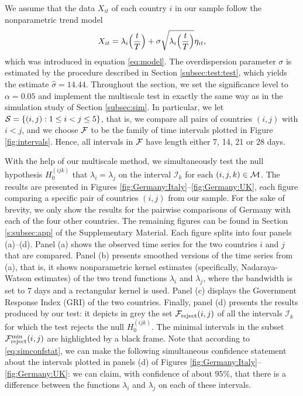 \documentclass[a4paper,12pt]{article}
\numberwithin{equation}{section}
\begin{document}
We assume that the data $X_{it}$ of each country $i$ in our sample follow the nonparametric trend model 
\[ X_{it} = \lambda_i\Big(\frac{t}{T}\Big) + \sigma \sqrt{\lambda_i\Big(\frac{t}{T}\Big)} \eta_{it}, \]
which was introduced in equation \eqref{eq:model}. The overdispersion parameter $\sigma$ is estimated by the procedure described in Section \ref{subsec:test:test}, which yields the estimate $\hat{\sigma} = 14.44$. Throughout the section, we set the significance level to $\alpha=0.05$ and implement the multiscale test in exactly the same way as in the simulation study of Section \ref{subsec:sim}. In particular, we let $\mathcal{S} = \{ (i,j): 1 \le i < j \le 5\}$, that is, we compare all pairs of countries $(i,j)$ with $i < j$, and we choose $\mathcal{F}$ to be the family of time intervals plotted in Figure \ref{fig:intervals}. Hence, all intervals in $\mathcal{F}$ have length either 7, 14, 21 or 28 days. 


With the help of our multiscale method, we simultaneously test the null hypo\-thesis $H_0^{(ijk)}$ that $\lambda_i = \lambda_j$ on the interval $\mathcal{I}_k$ for each $(i, j, k) \in \mathcal{M}$. The results are presented in Figures \ref{fig:Germany:Italy}--\ref{fig:Germany:UK}, each figure comparing a specific pair of countries $(i,j)$ from our sample. For the sake of brevity, we only show the results for the pairwise comparisons of Germany with each of the four other countries. The remaining figures can be found in Section \ref{s:subsec:app} of the Supplementary Material. Each figure splits into four panels (a)--(d).  Panel (a) shows the observed time series for the two countries $i$ and $j$ that are compared. Panel (b) presents smoothed versions of the time series from (a), that is, it shows nonparametric kernel estimates (specifically, Nadaraya-Watson estimates) of the two trend functions $\lambda_i$ and $\lambda_j$, where the bandwidth is set to $7$ days and a rectangular kernel is used. Panel (c) displays the Government Response Index (GRI) of the two countries. Finally, panel (d) presents the results produced by our test: it depicts in grey the set $\mathcal{F}_{\text{reject}}(i,j)$ of all the intervals $\mathcal{I}_k$ for which the test rejects the null $H_0^{(ijk)}$. The minimal intervals in the subset $\mathcal{F}_{\text{reject}}^{\text{min}}(i, j)$ are highlighted by a black frame. Note that according to \eqref{eq:simconfstat}, we can make the following simultaneous confidence statement about the intervals plotted in panels (d) of Figures \ref{fig:Germany:Italy}--\ref{fig:Germany:UK}: we can claim, with confidence of about $95\%$, that there is a difference between the functions $\lambda_i$ and $\lambda_j$ on each of these intervals.
\end{document}
